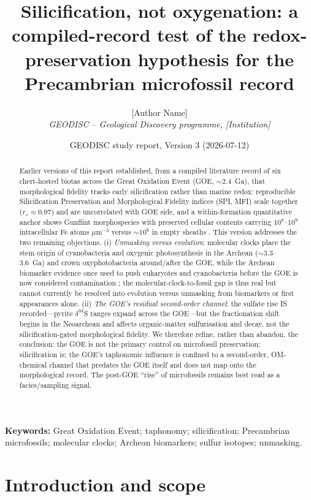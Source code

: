 \documentclass[11pt]{article}
\title{\vspace{-1.0cm}\textbf{Silicification, not oxygenation: a compiled-record test of the
redox-preservation hypothesis for the Precambrian microfossil record}}
\author{[Author Name]\\
\small\textit{GEODISC -- Geological Discovery programme, [Institution]}}
\date{\small GEODISC study report, Version 3 (2026-07-12)}
\begin{document}
\maketitle

\begin{abstract}\small
\noindent Earlier versions of this report established, from a compiled literature record of six
chert-hosted biotas across the Great Oxidation Event (GOE, $\sim$2.4~Ga), that morphological
fidelity tracks early silicification rather than marine redox: reproducible Silicification
Preservation and Morphological Fidelity indices (SPI, MFI) scale together ($r_{s}\approx0.97$) and
are uncorrelated with GOE side, and a within-formation quantitative anchor shows Gunflint
morphospecies with preserved cellular contents carrying $10^{8}$--$10^{9}$ intracellular Fe atoms
$\mu$m$^{-3}$ versus $\sim$$10^{6}$ in empty sheaths \citep{Lepot2017}. This version addresses the
two remaining objections. (i) \emph{Unmasking versus evolution}: molecular clocks place the stem
origin of cyanobacteria and oxygenic photosynthesis in the Archean ($\sim$3.3--3.6~Ga) and crown
oxyphotobacteria around/after the GOE, while the Archean biomarker evidence once used to push
eukaryotes and cyanobacteria before the GOE is now considered contamination
\citep{French2015}; the molecular-clock-to-fossil gap is thus real but cannot currently be resolved
into evolution versus unmasking from biomarkers or first appearances alone. (ii) \emph{The GOE's
residual second-order channel}: the sulfate rise IS recorded---pyrite $\delta^{34}$S ranges expand
across the GOE---but the fractionation shift begins in the Neoarchean and affects organic-matter
sulfurisation and decay, not the silicification-gated morphological fidelity. We therefore refine,
rather than abandon, the conclusion: the GOE is not the primary control on microfossil preservation;
silicification is; the GOE's taphonomic influence is confined to a second-order, OM-chemical channel
that predates the GOE itself and does not map onto the morphological record. The post-GOE ``rise''
of microfossils remains best read as a facies/sampling signal.
\end{abstract}

\noindent\textbf{Keywords:} Great Oxidation Event; taphonomy; silicification; Precambrian microfossils;
molecular clocks; Archean biomarkers; sulfur isotopes; unmasking.

\section{Introduction and scope}
\end{document}
